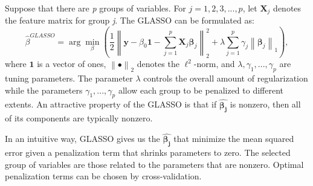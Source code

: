 Suppose that there are \textit{p} groups of variables. For $j = 1, 2, 3, ..., p$, let $\mathbf{X}_j$ denotes the feature matrix for group \textit{j}. The GLASSO can be formulated as:
\begin{equation}
\hat{\beta}^{G L A S S O}=\arg \min _{\beta}\left(\frac{1}{2}\left\|\mathbf{y}-\beta_{0} \mathbf{1}-\sum_{j=1}^{p} \mathbf{X}_{j} \boldsymbol{\beta}_{j}\right\|_{2}^{2}+\lambda \sum_{j=1}^{p} \gamma_{j}\left\|\boldsymbol{\beta}_{j}\right\|_{1}\right),
\end{equation}
where $\mathbf{1}$ is a vector of ones, $\left\| \bullet \right\|_2$ denotes the $\ell^{2}$-norm, and $\lambda, \gamma_1, ..., \gamma_p$ are tuning parameters. The parameter $\lambda$ controls the overall amount of regularization while the parameters $\gamma_1, ..., \gamma_p$ allow each group to be penalized to different extents. An attractive property of the GLASSO is that if $\boldsymbol{\hat{\beta_{j}}}$ is nonzero, then all of its components are typically nonzero.


In an intuitive way, GLASSO gives us the $\boldsymbol{\hat{\beta_j}}$ that minimize the mean squared error given a penalization term that shrinks parameters to zero. The selected group of variables are those related to the parameters that are nonzero. Optimal penalization terms can be chosen by cross-validation.

